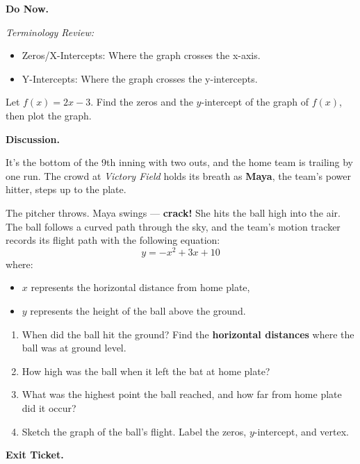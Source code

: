 \documentclass[10pt]{article}
\title{}
\date{}
\begin{document}
{\noindent\bf Do Now.}

{\it
Terminology Review:
\begin{itemize}[leftmargin=4em]
\item
Zeros/X-Intercepts: Where the graph crosses the x-axis. 
\item
Y-Intercepts: Where the graph crosses the y-intercepts.
\end{itemize}
}
Let \(f(x) = 2x -3\). Find the zeros and the $y$-intercept of the graph of $f(x)$, then plot the graph.

{\noindent\bf Discussion.}

It’s the bottom of the 9th inning with two outs, and the home team is trailing by one run. The crowd at \textit{Victory Field} holds its breath as \textbf{Maya}, the team’s power hitter, steps up to the plate.

The pitcher throws. Maya swings --- \textbf{crack!} She hits the ball high into the air. The ball follows a curved path through the sky, and the team’s motion tracker records its flight path with the following equation:
\[
y = -x^2 +3x +10
\]
where:
\begin{itemize}
    \item \( x \) represents the horizontal distance from home plate,
    \item \( y \) represents the height of the ball above the ground.
\end{itemize}

\begin{enumerate}
    \item When did the ball hit the ground? Find the \textbf{horizontal distances} where the ball was at ground level.
    \item How high was the ball when it left the bat at home plate?
    \clearpage
    \item What was the highest point the ball reached, and how far from home plate did it occur?
    \item Sketch the graph of the ball’s flight. Label the zeros, $y$-intercept, and vertex.
\end{enumerate}


{\noindent \bf Exit Ticket.}
\end{document}
